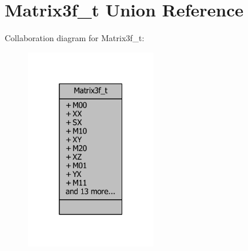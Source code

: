\section{Matrix3f\-\_\-t Union Reference}
\label{unionMatrix3f__t}


Collaboration diagram for Matrix3f\-\_\-t\-:
\nopagebreak
\begin{figure}[H]
\begin{center}
\leavevmode
\includegraphics[width=160pt]{da/d53/unionMatrix3f__t__coll__graph}
\end{center}
\end{figure}
